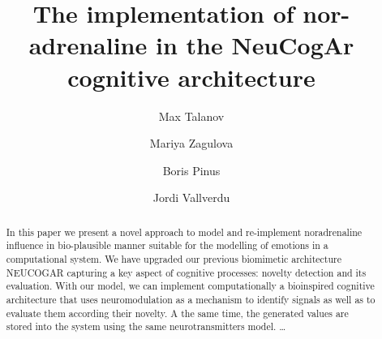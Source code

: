 \documentclass[oribibl]{llncs}
\begin{document}
\title{The implementation of nor-adrenaline in the NeuCogAr cognitive architecture}


%

\author{
Max Talanov
\and Mariya Zagulova
\and Boris Pinus
\and Jordi Vallverdu
}




\maketitle

\begin{abstract}

  In this paper we present a novel approach to model and re-implement noradrenaline influence in
  bio-plausible manner suitable for the modelling of emotions in a computational system. 
  We have upgraded our previous biomimetic architecture NEUCOGAR capturing a key aspect of cognitive processes: novelty detection and its evaluation.
  With our model, we can implement computationally a bioinspired cognitive architecture that uses neuromodulation as a mechanism to identify 
  signals as well as to evaluate them according their novelty. A the same time, the generated values are stored into the system using the same neurotransmitters model.
  \ldots{}


\end{abstract}
\end{document}
